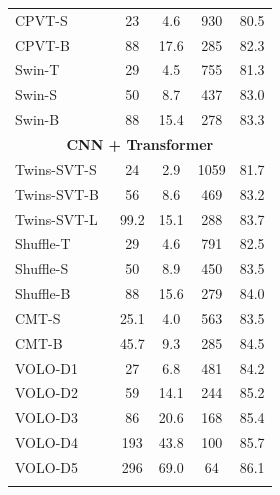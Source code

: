 \begin{table}[]
\begin{tabular}{l|c|c|c|c}
		\hline
		CPVT-S~ & 23 & 4.6  & 930 & 80.5 \\
		CPVT-B~ & 88 & 17.6  & 285 & 82.3 \\  
		\hline		
		Swin-T~  & 29 & 4.5  & 755 & 81.3
 \\ 
		Swin-S~  & 50 & 8.7  &  437 & 83.0 \\
		Swin-B~  & 88 & 15.4  &  278 & 83.3 \\ 
		\hline
		\multicolumn{5}{c}{\textbf{CNN + Transformer}} \\
		\hline
		Twins-SVT-S~ & 24 & 2.9  & 1059 & 81.7 \\
		Twins-SVT-B~ & 56 & 8.6  & 469  & 83.2 \\
		Twins-SVT-L~ & 99.2 & 15.1  & 288 & 83.7 \\
		\hline 
		Shuffle-T~  & 29 & 4.6  & 791 & 82.5 \\%
		Shuffle-S~  & 50 & 8.9  &   450 & 83.5 \\ 
		Shuffle-B~  &  88 & 15.6   &   279 & 84.0 \\	
		\hline
		CMT-S~  & 25.1 & 4.0  & 563 & 83.5 \\ 
		CMT-B~   & 45.7 & 9.3  &  285 & 84.5 \\ 
		\hline 
		VOLO-D1~  & 27 & 6.8  & 481 & 84.2 \\	
		VOLO-D2~  & 59 & 14.1 & 244 & 85.2 \\
		VOLO-D3~  & 86 & 20.6  & 168 & 85.4 \\
		VOLO-D4~  & 193 & 43.8   & 100 & 85.7 \\
		VOLO-D5~  & 296 & 69.0   & 64 & 86.1 \\
		\Xhline{1.2pt}
	\end{tabular}
\vspace{-1em}
\end{table}
\footnotetext[1]{}

